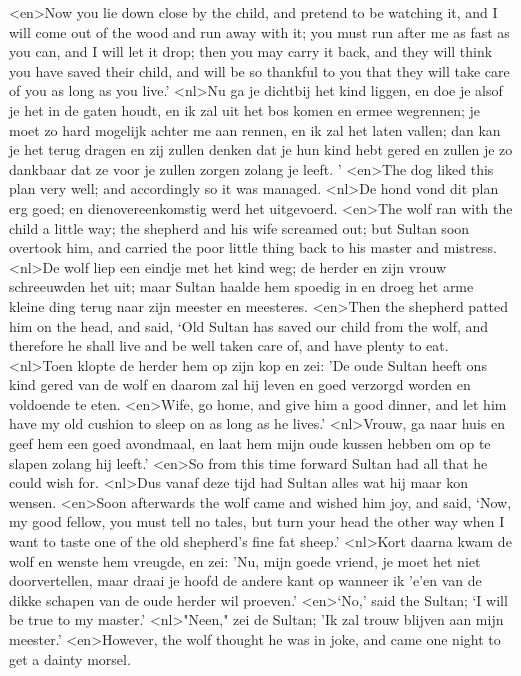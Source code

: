<en>Now you lie down close by the child, and pretend to be watching it, and I will come out of the wood and run away with it; you must run after me as fast as you can, and I will let it drop; then you may carry it back, and they will think you have saved their child, and will be so thankful to you that they will take care of you as long as you live.’
<nl>Nu ga je dichtbij het kind liggen, en doe je alsof je het in de gaten houdt, en ik zal uit het bos komen en ermee wegrennen; je moet zo hard mogelijk achter me aan rennen, en ik zal het laten vallen; dan kan je het terug dragen en zij zullen denken dat je hun kind hebt gered en zullen je zo dankbaar dat ze voor je zullen zorgen zolang je leeft. '
<en>The dog liked this plan very well; and accordingly so it was managed.
<nl>De hond vond dit plan erg goed; en dienovereenkomstig werd het uitgevoerd.
<en>The wolf ran with the child a little way; the shepherd and his wife screamed out; but Sultan soon overtook him, and carried the poor little thing back to his master and mistress.
<nl>De wolf liep een eindje met het kind weg; de herder en zijn vrouw schreeuwden het uit; maar Sultan haalde hem spoedig in en droeg het arme kleine ding terug naar zijn meester en meesteres.
<en>Then the shepherd patted him on the head, and said, ‘Old Sultan has saved our child from the wolf, and therefore he shall live and be well taken care of, and have plenty to eat.
<nl>Toen klopte de herder hem op zijn kop en zei: 'De oude Sultan heeft ons kind gered van de wolf en daarom zal hij leven en goed verzorgd worden en voldoende te eten.
<en>Wife, go home, and give him a good dinner, and let him have my old cushion to sleep on as long as he lives.’
<nl>Vrouw, ga naar huis en geef hem een goed avondmaal, en laat hem mijn oude kussen hebben om op te slapen zolang hij leeft.'
<en>So from this time forward Sultan had all that he could wish for.
<nl>Dus vanaf deze tijd had Sultan alles wat hij maar kon wensen.
<en>Soon afterwards the wolf came and wished him joy, and said, ‘Now, my good fellow, you must tell no tales, but turn your head the other way when I want to taste one of the old shepherd’s fine fat sheep.’
<nl>Kort daarna kwam de wolf en wenste hem vreugde, en zei: 'Nu, mijn goede vriend, je moet het niet doorvertellen, maar draai je hoofd de andere kant op wanneer ik 'e'en van de dikke schapen van de oude herder wil proeven.'
<en>‘No,’ said the Sultan; ‘I will be true to my master.’
<nl>"Neen," zei de Sultan; 'Ik zal trouw blijven aan mijn meester.'
<en>However, the wolf thought he was in joke, and came one night to get a dainty morsel.
